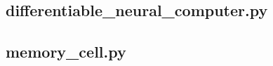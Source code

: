 \documentclass[draft,final]{vutinfth} %
\begin{document}
    \subsection{differentiable\_neural\_computer.py}
    
    \subsection{memory\_cell.py}
    
    


    \backmatter

    \listoffigures %

    \cleardoublepage %
    \listoftables %


    \printindex

    \printglossaries

    
    
\end{document}
